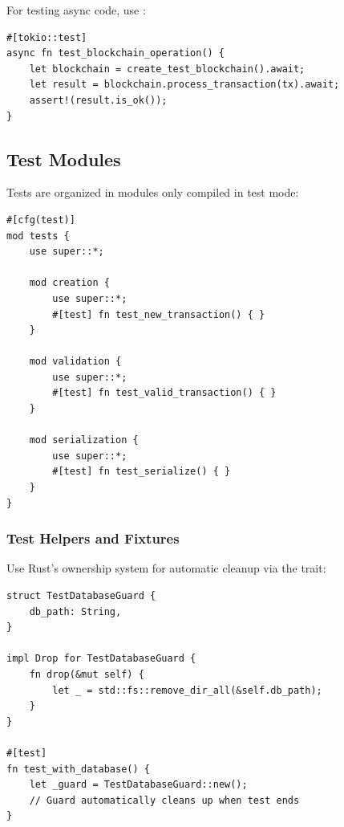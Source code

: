 For testing async code, use :

\begin{listing}[htbp]
\caption{Async test with tokio}
\label{lst:ch24-test-async}
\begin{verbatim}
#[tokio::test]
async fn test_blockchain_operation() {
    let blockchain = create_test_blockchain().await;
    let result = blockchain.process_transaction(tx).await;
    assert!(result.is_ok());
}
\end{verbatim}
\end{listing}

\subsection{Test Modules}
\label{subsec:ch24-test-modules}

Tests are organized in modules only compiled in test mode:

\begin{listing}[htbp]
\caption{Test module organization}
\label{lst:ch24-test-module}
\begin{verbatim}
#[cfg(test)]
mod tests {
    use super::*;

    mod creation {
        use super::*;
        #[test] fn test_new_transaction() { }
    }

    mod validation {
        use super::*;
        #[test] fn test_valid_transaction() { }
    }

    mod serialization {
        use super::*;
        #[test] fn test_serialize() { }
    }
}
\end{verbatim}
\end{listing}

\subsubsection{Test Helpers and Fixtures}

Use Rust's ownership system for automatic cleanup via the  trait:

\begin{listing}[htbp]
\caption{RAII-based test fixture}
\label{lst:ch24-test-fixture}
\begin{verbatim}
struct TestDatabaseGuard {
    db_path: String,
}

impl Drop for TestDatabaseGuard {
    fn drop(&mut self) {
        let _ = std::fs::remove_dir_all(&self.db_path);
    }
}

#[test]
fn test_with_database() {
    let _guard = TestDatabaseGuard::new();
    // Guard automatically cleans up when test ends
}
\end{verbatim}
\end{listing}

